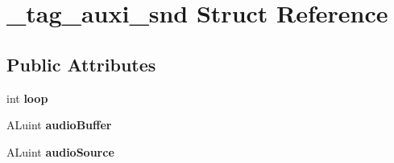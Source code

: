\hypertarget{struct__tag__auxi__snd}{}\section{\+\_\+tag\+\_\+auxi\+\_\+snd Struct Reference}
\label{struct__tag__auxi__snd}
\subsection*{Public Attributes}
\begin{DoxyCompactItemize}
\item 
int {\bfseries loop}\hypertarget{struct__tag__auxi__snd_a3ce3051efcfb46b2ed8f14e5f6435437}{}\label{struct__tag__auxi__snd_a3ce3051efcfb46b2ed8f14e5f6435437}

\item 
A\+Luint {\bfseries audio\+Buffer}\hypertarget{struct__tag__auxi__snd_a36f84ca6a08ba3813e90af853b54600e}{}\label{struct__tag__auxi__snd_a36f84ca6a08ba3813e90af853b54600e}

\item 
A\+Luint {\bfseries audio\+Source}\hypertarget{struct__tag__auxi__snd_a0b54657440f082a9ff74a0240aa3ce9c}{}\label{struct__tag__auxi__snd_a0b54657440f082a9ff74a0240aa3ce9c}

\end{DoxyCompactItemize}
